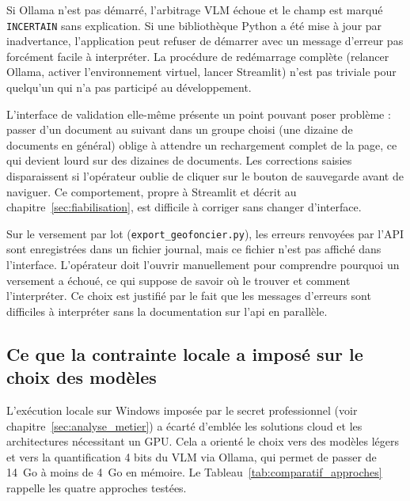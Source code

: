 Si Ollama n'est pas démarré, l'arbitrage VLM échoue et le champ est marqué \texttt{INCERTAIN} sans explication. Si une bibliothèque Python a été mise à jour par inadvertance, l'application peut refuser de démarrer avec un message d'erreur pas forcément facile à interpréter. La procédure de redémarrage complète (relancer Ollama, activer l'environnement virtuel, lancer Streamlit) n'est pas triviale pour quelqu'un qui n'a pas participé au développement.

L'interface de validation elle-même présente un point pouvant poser problème : passer d'un document au suivant dans un groupe choisi (une dizaine de documents en général) oblige à attendre un rechargement complet de la page, ce qui devient lourd sur des dizaines de documents. Les corrections saisies disparaissent si l'opérateur oublie de cliquer sur le bouton de sauvegarde avant de naviguer. Ce comportement, propre à Streamlit et décrit au chapitre~\ref{sec:fiabilisation}, est difficile à corriger sans changer d'interface.

Sur le versement par lot (\texttt{export\_geofoncier.py}), les erreurs renvoyées par l'API sont enregistrées dans un fichier journal, mais ce fichier n'est pas affiché dans l'interface. L'opérateur doit l'ouvrir manuellement pour comprendre pourquoi un versement a échoué, ce qui suppose de savoir où le trouver et comment l'interpréter. Ce choix est justifié par le fait que les messages d'erreurs sont difficiles à interpréter sans la documentation sur l'api en parallèle. 


\subsection{Ce que la contrainte locale a imposé sur le choix des modèles}

L'exécution locale sur Windows imposée par le secret professionnel (voir chapitre~\ref{sec:analyse_metier}) a écarté d'emblée les solutions cloud et les architectures nécessitant un GPU. Cela a orienté le choix vers des modèles légers et vers la quantification 4 bits du VLM via Ollama, qui permet de passer de 14~Go à moins de 4~Go en mémoire. Le Tableau~\ref{tab:comparatif_approches} rappelle les quatre approches testées.

